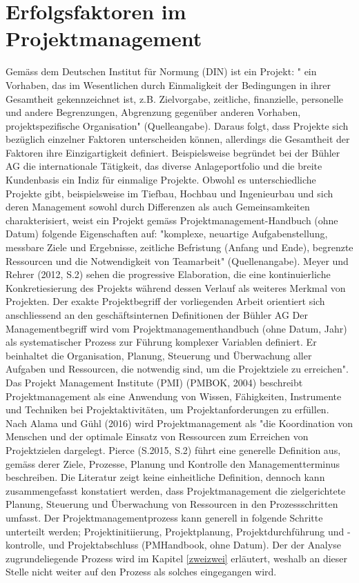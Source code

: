 \section{Erfolgsfaktoren im Projektmanagement} \label{sec:erfprj}	
Gemäss dem Deutschen Institut für Normung (DIN) ist ein Projekt: " ein Vorhaben, das im Wesentlichen durch Einmaligkeit der Bedingungen in ihrer Gesamtheit gekennzeichnet ist, z.B. Zielvorgabe, zeitliche, finanzielle, personelle und andere Begrenzungen, Abgrenzung gegenüber anderen Vorhaben, projektspezifische Organisation" (Quelleangabe). Daraus folgt, dass Projekte sich bezüglich einzelner Faktoren unterscheiden können, allerdings die Gesamtheit der Faktoren ihre Einzigartigkeit definiert. Beispielsweise begründet bei der Bühler AG die internationale Tätigkeit, das diverse Anlageportfolio und die breite Kundenbasis ein Indiz für einmalige Projekte. Obwohl es unterschiedliche Projekte gibt, beispielsweise im Tiefbau, Hochbau und Ingenieurbau und sich deren Management sowohl durch Differenzen als auch Gemeinsamkeiten charakterisiert, weist ein Projekt gemäss Projektmanagement-Handbuch (ohne Datum) folgende Eigenschaften auf: "komplexe, neuartige Aufgabenstellung, messbare Ziele und Ergebnisse, zeitliche Befristung (Anfang und Ende), begrenzte Ressourcen und die Notwendigkeit von Teamarbeit" (Quellenangabe). Meyer und Rehrer (2012, S.2) sehen die progressive Elaboration, die eine kontinuierliche Konkretiesierung des Projekts während dessen Verlauf als weiteres Merkmal von Projekten. Der exakte Projektbegriff der vorliegenden Arbeit orientiert sich anschliessend an den geschäftsinternen Definitionen der Bühler AG
\newline
Der Managementbegriff wird vom Projektmanagementhandbuch (ohne Datum, Jahr) als systematischer Prozess zur Führung komplexer Variablen definiert. Er beinhaltet die Organisation, Planung, Steuerung und Überwachung aller Aufgaben und Ressourcen, die notwendig sind, um die Projektziele zu erreichen". Das Projekt Management Institute (PMI) (PMBOK, 2004) beschreibt Projektmanagement als eine Anwendung von Wissen, Fähigkeiten, Instrumente und Techniken bei Projektaktivitäten, um Projektanforderungen zu erfüllen. Nach Alama und Gühl (2016) wird Projektmanagement als "die Koordination von Menschen und der optimale Einsatz von Ressourcen zum Erreichen von Projektzielen dargelegt. Pierce (S.2015, S.2) führt eine generelle Definition aus, gemäss derer Ziele, Prozesse, Planung und Kontrolle den Managementterminus beschreiben. Die Literatur zeigt keine einheitliche Definition, dennoch kann zusammengefasst konstatiert werden, dass Projektmanagement die zielgerichtete Planung, Steuerung und Überwachung von  Ressourcen in den Prozessschritten umfasst. Der Projektmanagementprozess kann generell in folgende Schritte unterteilt werden; Projektinitiierung, Projektplanung, Projektdurchführung und -kontrolle, und Projektabschluss (PMHandbook, ohne Datum). Der der Analyse zugrundeliegende Prozess wird im Kapitel \ref{zweizwei} erläutert, weshalb an dieser Stelle nicht weiter auf den Prozess als solches eingegangen wird. 
